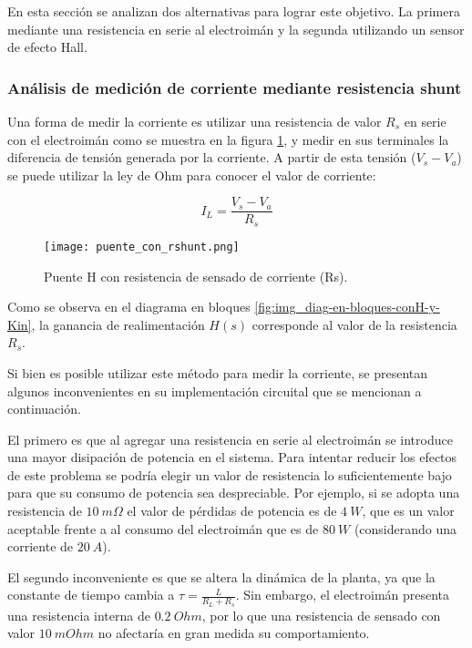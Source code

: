 En esta sección se analizan dos alternativas para lograr este objetivo. La primera mediante una resistencia en serie al electroimán y la segunda utilizando un sensor de efecto Hall.


\subsubsection{Análisis de medición de corriente mediante resistencia shunt}

Una forma de medir la corriente es utilizar una resistencia de valor $R_s$ en serie con el electroimán como se muestra en la figura \ref{fig:img_puente_con_rshunt}, y medir en sus terminales la diferencia de tensión generada por la corriente. A partir de esta tensión ($V_s-V_a$) se puede utilizar la ley de Ohm para conocer el valor de corriente:

\begin{equation}
	I_L=\frac{V_s-V_a}{R_s}
\end{equation}

\begin{figure}[H]
	\centering
	\texttt{[image: puente\_con\_rshunt.png]}
	\caption{Puente H con resistencia de sensado de corriente (Rs).}
	\label{fig:img_puente_con_rshunt}
\end{figure}

Como se observa en el diagrama en bloques \ref{fig:img_diag-en-bloques-conH-y-Kin}, la ganancia de realimentación $H(s)$ corresponde al valor de la resistencia $R_s$.

Si bien es posible utilizar este método para medir la corriente, se presentan algunos inconvenientes en su implementación circuital que se mencionan a continuación.

El primero es que al agregar una resistencia en serie al electroimán se introduce una mayor disipación de potencia en el sistema. Para intentar reducir los efectos de este problema se podría elegir un valor de resistencia lo suficientemente bajo para que su consumo de potencia sea despreciable. Por ejemplo, si se adopta una resistencia de $10\:m\Omega$ el valor de pérdidas de potencia es de $4\:W$, que es un valor aceptable frente a al consumo del electroimán que es de $80\:W$ (considerando una corriente de $20\:A$).

El segundo inconveniente es que se altera la dinámica de la planta, ya que la constante de tiempo cambia a $\tau=\frac{L}{R_L+R_s}$. Sin embargo, el electroimán presenta una resistencia interna de $0.2\:Ohm$, por lo que una resistencia de sensado con valor $10\:mOhm$ no afectaría en gran medida su comportamiento.

